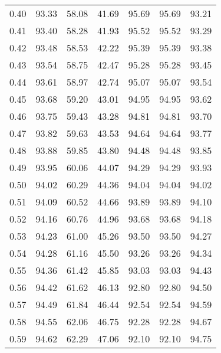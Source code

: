 \begin{tabular}{|c|c|c|c|c|c|c|}
      0.40 &     93.33 &     58.08 &      41.69 &   95.69 &      95.69 &         93.21 \\
      0.41 &     93.40 &     58.28 &      41.93 &   95.52 &      95.52 &         93.29 \\
      0.42 &     93.48 &     58.53 &      42.22 &   95.39 &      95.39 &         93.38 \\
      0.43 &     93.54 &     58.75 &      42.47 &   95.28 &      95.28 &         93.45 \\
      0.44 &     93.61 &     58.97 &      42.74 &   95.07 &      95.07 &         93.54 \\
      0.45 &     93.68 &     59.20 &      43.01 &   94.95 &      94.95 &         93.62 \\
      0.46 &     93.75 &     59.43 &      43.28 &   94.81 &      94.81 &         93.70 \\
      0.47 &     93.82 &     59.63 &      43.53 &   94.64 &      94.64 &         93.77 \\
      0.48 &     93.88 &     59.85 &      43.80 &   94.48 &      94.48 &         93.85 \\
      0.49 &     93.95 &     60.06 &      44.07 &   94.29 &      94.29 &         93.93 \\
      0.50 &     94.02 &     60.29 &      44.36 &   94.04 &      94.04 &         94.02 \\
      0.51 &     94.09 &     60.52 &      44.66 &   93.89 &      93.89 &         94.10 \\
      0.52 &     94.16 &     60.76 &      44.96 &   93.68 &      93.68 &         94.18 \\
      0.53 &     94.23 &     61.00 &      45.26 &   93.50 &      93.50 &         94.27 \\
      0.54 &     94.28 &     61.16 &      45.50 &   93.26 &      93.26 &         94.34 \\
      0.55 &     94.36 &     61.42 &      45.85 &   93.03 &      93.03 &         94.43 \\
      0.56 &     94.42 &     61.62 &      46.13 &   92.80 &      92.80 &         94.50 \\
      0.57 &     94.49 &     61.84 &      46.44 &   92.54 &      92.54 &         94.59 \\
      0.58 &     94.55 &     62.06 &      46.75 &   92.28 &      92.28 &         94.67 \\
      0.59 &     94.62 &     62.29 &      47.06 &   92.10 &      92.10 &         94.75 \\

\end{tabular}
